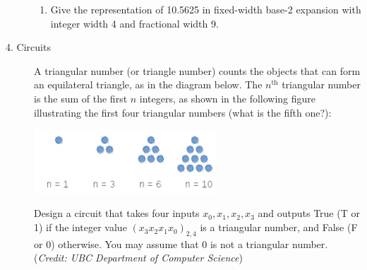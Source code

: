 \documentclass[12pt, oneside]{article}
\begin{document}
\begin{description}
\begin{enumerate}
\item Give the representation of 10.5625 in fixed-width base-2 expansion with
integer width 4 and fractional width 9.

\ifsolution
{}
\else{}
\fi
\end{enumerate}


\item[4. Circuits]   
A triangular number (or triangle number) counts the objects that can form an equilateral
triangle, as in the diagram below. The $n^{\text{th}}$ triangular number is the sum of the first $n$
 integers,
as shown in the following figure illustrating the first four triangular numbers (what is the
fifth one?):
\begin{center}
\includegraphics[width=2.7in]{../../resources/images/triangle.png}
\end{center}
Design a circuit that takes four inputs $x_0, x_1, x_2, x_3$ and outputs
True (T or 1) if the integer value 
$(x_3x_2x_1x_0)_{2,4} $ is a triangular number, and False (F or 0) otherwise. You may assume that 0 is
not a triangular number. ({\it Credit: UBC Department of Computer Science})


\end{description}
\end{document}

